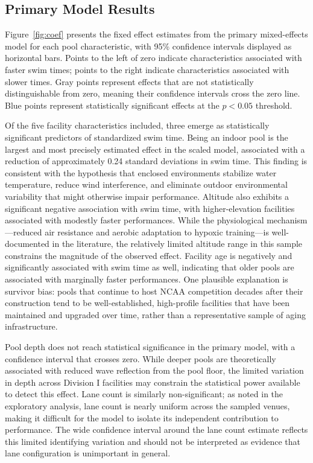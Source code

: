 \documentclass[12pt]{article}
\begin{document}
\subsection{Primary Model Results}

Figure~\ref{fig:coef} presents the fixed effect estimates from the primary
mixed-effects model for each pool characteristic, with 95\% confidence intervals
displayed as horizontal bars. Points to the left of zero indicate
characteristics associated with faster swim times; points to the right indicate
characteristics associated with slower times. Gray points represent effects that
are not statistically distinguishable from zero, meaning their confidence
intervals cross the zero line. Blue points represent statistically significant
effects at the $p < 0.05$ threshold.

Of the five facility characteristics included, three emerge as statistically
significant predictors of standardized swim time. Being an indoor pool is the
largest and most precisely estimated effect in the scaled model, associated with
a reduction of approximately 0.24 standard deviations in swim time. This
finding is consistent with the hypothesis that enclosed environments stabilize
water temperature, reduce wind interference, and eliminate outdoor environmental
variability that might otherwise impair performance. Altitude also exhibits a
significant negative association with swim time, with higher-elevation
facilities associated with modestly faster performances. While the physiological
mechanism---reduced air resistance and aerobic adaptation to hypoxic
training---is well-documented in the literature, the relatively limited altitude
range in this sample constrains the magnitude of the observed effect. Facility
age is negatively and significantly associated with swim time as well, indicating
that older pools are associated with marginally faster performances. One
plausible explanation is survivor bias: pools that continue to host NCAA
competition decades after their construction tend to be well-established,
high-profile facilities that have been maintained and upgraded over time, rather
than a representative sample of aging infrastructure.

Pool depth does not reach statistical significance in the primary model, with a
confidence interval that crosses zero. While deeper pools are theoretically
associated with reduced wave reflection from the pool floor, the limited
variation in depth across Division I facilities may constrain the statistical
power available to detect this effect. Lane count is similarly non-significant;
as noted in the exploratory analysis, lane count is nearly uniform across the
sampled venues, making it difficult for the model to isolate its independent
contribution to performance. The wide confidence interval around the lane count
estimate reflects this limited identifying variation and should not be
interpreted as evidence that lane configuration is unimportant in general.
\end{document}
